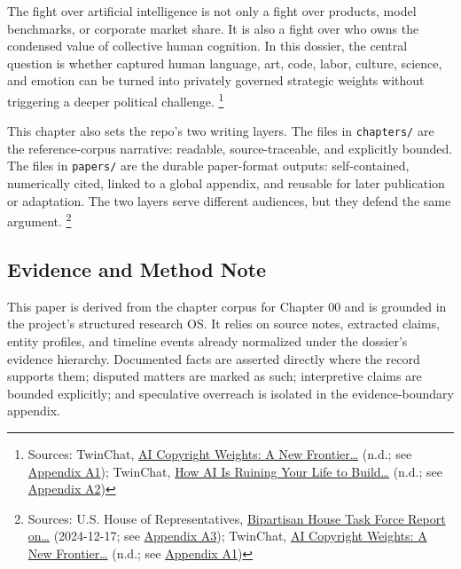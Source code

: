 \documentclass[
  american,
  11pt,
  letterpaper,
]{article}
\begin{document}
The fight over artificial intelligence is not only a fight over
products, model benchmarks, or corporate market share. It is also a
fight over who owns the condensed value of collective human cognition.
In this dossier, the central question is whether captured human
language, art, code, labor, culture, science, and emotion can be turned
into privately governed strategic weights without triggering a deeper
political challenge. \footnote{Sources: TwinChat,
  \href{https://medium.com/twinchat/ai-copyright-weights-a-new-frontier-in-intellectual-property-law-d8ee1b6c55ee}{AI
  Copyright Weights: A New Frontier\ldots{}} (n.d.; see
  \hyperref[ch-00-appendix-a1-ai-copyright-weights-a-new-frontier-in-intellectual-property-law]{Appendix
  A1}); TwinChat,
  \href{https://medium.com/twinchat/how-ai-is-ruining-your-life-to-build-an-empire-8b6d02e55bc9}{How
  AI Is Ruining Your Life to Build\ldots{}} (n.d.; see
  \hyperref[ch-00-appendix-a2-how-ai-is-ruining-your-life-to-build-an-empire]{Appendix
  A2})}

This chapter also sets the repo's two writing layers. The files in
\texttt{chapters/} are the reference-corpus narrative: readable,
source-traceable, and explicitly bounded. The files in \texttt{papers/}
are the durable paper-format outputs: self-contained, numerically cited,
linked to a global appendix, and reusable for later publication or
adaptation. The two layers serve different audiences, but they defend
the same argument. \footnote{Sources: U.S. House of Representatives,
  \href{https://www.speaker.gov/wp-content/uploads/2024/12/AI-Task-Force-Report-FINAL.pdf}{Bipartisan
  House Task Force Report on\ldots{}} (2024-12-17; see
  \hyperref[ch-00-appendix-a3-bipartisan-house-task-force-report-on-artificial-intelligence]{Appendix
  A3}); TwinChat,
  \href{https://medium.com/twinchat/ai-copyright-weights-a-new-frontier-in-intellectual-property-law-d8ee1b6c55ee}{AI
  Copyright Weights: A New Frontier\ldots{}} (n.d.; see
  \hyperref[ch-00-appendix-a1-ai-copyright-weights-a-new-frontier-in-intellectual-property-law]{Appendix
  A1})}

\subsection{Evidence and Method Note}\label{evidence-and-method-note}

This paper is derived from the chapter corpus for Chapter 00 and is
grounded in the project's structured research OS. It relies on source
notes, extracted claims, entity profiles, and timeline events already
normalized under the dossier's evidence hierarchy. Documented facts are
asserted directly where the record supports them; disputed matters are
marked as such; interpretive claims are bounded explicitly; and
speculative overreach is isolated in the evidence-boundary appendix.
\end{document}
